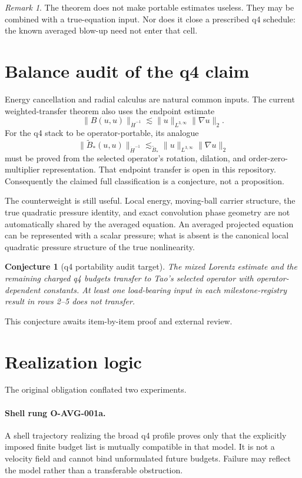 \documentclass[11pt]{article}
\newtheorem{conjecture}[theorem]{Conjecture}
\theoremstyle{remark}
\newtheorem{remark}[theorem]{Remark}
\begin{document}
\begin{remark}
The theorem does not make portable estimates useless.  They may be
combined with a true-equation input.  Nor does it close a prescribed
q4 schedule: the known averaged blow-up need not enter that cell.
\end{remark}

\section{Balance audit of the q4 claim}

Energy cancellation and radial calculus are natural common inputs.
The current weighted-transfer theorem also uses the endpoint estimate
\[
 \|B(u,u)\|_{\dot H^{-1}}
 \lesssim
 \|u\|_{L^{3,\infty}}\|\nabla u\|_2.
\]
For the q4 stack to be operator-portable, its analogue
\[
 \|\widetilde B_*(u,u)\|_{\dot H^{-1}}
 \lesssim_{\widetilde B_*}
 \|u\|_{L^{3,\infty}}\|\nabla u\|_2
\]
must be proved from the selected operator's rotation, dilation, and
order-zero-multiplier representation.  That endpoint transfer is open
in this repository.  Consequently the claimed full classification is
a conjecture, not a proposition.

The counterweight is still useful.  Local energy, moving-ball carrier
structure, the true quadratic pressure identity, and exact convolution
phase geometry are not automatically shared by the averaged equation.
An averaged projected equation can be represented with a scalar
pressure; what is absent is the canonical local quadratic pressure
structure of the true nonlinearity.

\begin{conjecture}[q4 portability audit target]
The mixed Lorentz estimate and the remaining charged q4 budgets
transfer to Tao's selected operator with operator-dependent constants.
At least one load-bearing input in each milestone-registry result in
rows 2--5 does not transfer.
\end{conjecture}

This conjecture awaits item-by-item proof and external review.

\section{Realization logic}

The original obligation conflated two experiments.

\paragraph{Shell rung O-AVG-001a.}
A shell trajectory realizing the broad q4 profile proves only that the
explicitly imposed finite budget list is mutually compatible in that
model.  It is not a velocity field and cannot bind unformulated future
budgets.  Failure may reflect the model rather than a transferable
obstruction.
\end{document}
